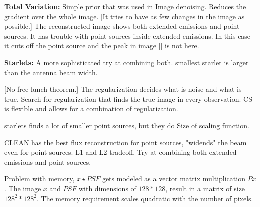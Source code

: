 \textbf{Total Variation:} Simple prior that was used in Image denoising. Reduces the gradient over the whole image. [It tries to have as few changes in the image as possible.] The reconstructed image shows both extended emissions and point sources. It has trouble with point sources inside extended emissions. In this case it cuts off the point source and the peak in image \ref{} is not here.

\textbf{Starlets:} A more sophisticated try at combining both. smallest starlet is larger than the antenna beam width.



[No free lunch theorem.] The regularization decides what is noise and what is true. Search for regularization that finds the true image in every observation. CS is flexible and allows for a combination of regularization.

starlets finds a lot of smaller point sources, but they do
Size of scaling function.

CLEAN has the best flux reconstruction for point sources, "widends" the beam even for point sources. L1 and L2 tradeoff. Try at combining both extended emissions and point sources.

Problem with memory, $x \star PSF$ gets modeled as a vector matrix multiplication $Px$. The image $x$ and $PSF$ with dimensions of $128 * 128$, result in a matrix of size $128^2 * 128^2$. The memory requirement scales quadratic with the number of pixels. 


